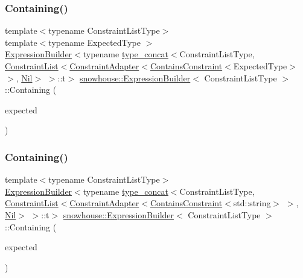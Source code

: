 \subsubsection{\texorpdfstring{Containing()}{Containing()}\hspace{0.1cm}{\footnotesize\ttfamily [1/2]}}
{\footnotesize\ttfamily template$<$typename Constraint\+List\+Type$>$ \\
template$<$typename Expected\+Type $>$ \\
\mbox{\hyperlink{structsnowhouse_1_1ExpressionBuilder}{Expression\+Builder}}$<$typename \mbox{\hyperlink{structsnowhouse_1_1type__concat}{type\+\_\+concat}}$<$Constraint\+List\+Type, \mbox{\hyperlink{structsnowhouse_1_1ConstraintList}{Constraint\+List}}$<$\mbox{\hyperlink{structsnowhouse_1_1ConstraintAdapter}{Constraint\+Adapter}}$<$\mbox{\hyperlink{structsnowhouse_1_1ContainsConstraint}{Contains\+Constraint}}$<$Expected\+Type$>$ $>$, \mbox{\hyperlink{structsnowhouse_1_1Nil}{Nil}}$>$ $>$\+::t$>$ \mbox{\hyperlink{structsnowhouse_1_1ExpressionBuilder}{snowhouse\+::\+Expression\+Builder}}$<$ Constraint\+List\+Type $>$\+::Containing (\begin{DoxyParamCaption}\item[{const Expected\+Type \&}]{expected }\end{DoxyParamCaption})\hspace{0.3cm}{\ttfamily [inline]}}

\mbox{\label{structsnowhouse_1_1ExpressionBuilder_a60972f18f9d4791be8052f0ad2bedd64}} 
\subsubsection{\texorpdfstring{Containing()}{Containing()}\hspace{0.1cm}{\footnotesize\ttfamily [2/2]}}
{\footnotesize\ttfamily template$<$typename Constraint\+List\+Type$>$ \\
\mbox{\hyperlink{structsnowhouse_1_1ExpressionBuilder}{Expression\+Builder}}$<$typename \mbox{\hyperlink{structsnowhouse_1_1type__concat}{type\+\_\+concat}}$<$Constraint\+List\+Type, \mbox{\hyperlink{structsnowhouse_1_1ConstraintList}{Constraint\+List}}$<$\mbox{\hyperlink{structsnowhouse_1_1ConstraintAdapter}{Constraint\+Adapter}}$<$\mbox{\hyperlink{structsnowhouse_1_1ContainsConstraint}{Contains\+Constraint}}$<$std\+::string$>$ $>$, \mbox{\hyperlink{structsnowhouse_1_1Nil}{Nil}}$>$ $>$\+::t$>$ \mbox{\hyperlink{structsnowhouse_1_1ExpressionBuilder}{snowhouse\+::\+Expression\+Builder}}$<$ Constraint\+List\+Type $>$\+::Containing (\begin{DoxyParamCaption}\item[{const char $\ast$}]{expected }\end{DoxyParamCaption})\hspace{0.3cm}{\ttfamily [inline]}}

